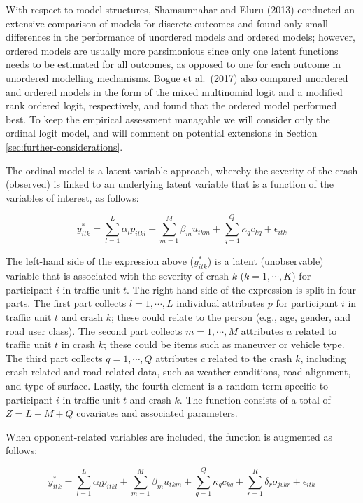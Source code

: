 \documentclass[]{elsarticle} %
\begin{document}
With respect to model structures, Shamsunnahar and Eluru (2013)
conducted an extensive comparison of models for discrete outcomes and
found only small differences in the performance of unordered models and
ordered models; however, ordered models are usually more parsimonious
since only one latent functions needs to be estimated for all outcomes,
as opposed to one for each outcome in unordered modelling mechanisms.
Bogue et al.~(2017) also compared unordered and ordered models in the
form of the mixed multinomial logit and a modified rank ordered logit,
respectively, and found that the ordered model performed best. To keep
the empirical assessment managable we will consider only the ordinal
logit model, and will comment on potential extensions in Section
\ref{sec:further-considerations}.

The ordinal model is a latent-variable approach, whereby the severity of
the crash (observed) is linked to an underlying latent variable that is
a function of the variables of interest, as follows:

\begin{equation}
\label{eq:latent-function}
y_{itk}^*=\sum_{l=1}^L\alpha_lp_{itkl} + \sum_{m=1}^M\beta_mu_{tkm} + \sum_{q=1}^Q\kappa_qc_{kq} + \epsilon_{itk}
\end{equation}

The left-hand side of the expression above (\(y_{itk}^*\)) is a latent
(unobservable) variable that is associated with the severity of crash
\(k\) (\(k=1,\cdots,K\)) for participant \(i\) in traffic unit \(t\).
The right-hand side of the expression is split in four parts. The first
part collects \(l=1,\cdots,L\) individual attributes \(p\) for
participant \(i\) in traffic unit \(t\) and crash \(k\); these could
relate to the person (e.g., age, gender, and road user class). The
second part collects \(m=1,\cdots,M\) attributes \(u\) related to
traffic unit \(t\) in crash \(k\); these could be items such as maneuver
or vehicle type. The third part collects \(q=1,\cdots,Q\) attributes
\(c\) related to the crash \(k\), including crash-related and
road-related data, such as weather conditions, road alignment, and type
of surface. Lastly, the fourth element is a random term specific to
participant \(i\) in traffic unit \(t\) and crash \(k\). The function
consists of a total of \(Z=L+M+Q\) covariates and associated parameters.

When opponent-related variables are included, the function is augmented
as follows:

\begin{equation}
\label{eq:latent-function-with-opponent-variables}
y_{itk}^*=\sum_{l=1}^L\alpha_lp_{itkl} + \sum_{m=1}^M\beta_mu_{tkm} + \sum_{q=1}^Q\kappa_qc_{kq} + \sum_{r=1}^R\delta_ro_{jvkr} + \epsilon_{itk}
\end{equation}
\end{document}
